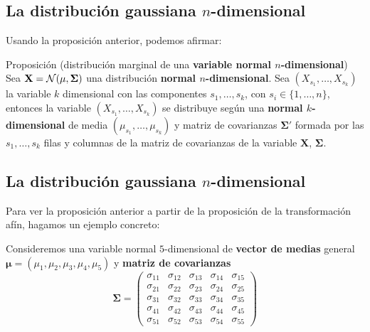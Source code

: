 \documentclass[]{book}
\begin{document}
\hypertarget{la-distribuciuxf3n-gaussiana-n-dimensional-4}{%
\subsection{\texorpdfstring{La distribución gaussiana \(n\)-dimensional}{La distribución gaussiana n-dimensional}}\label{la-distribuciuxf3n-gaussiana-n-dimensional-4}}

Usando la proposición anterior, podemos afirmar:

Proposición (distribución marginal de una \textbf{variable normal \(n\)-dimensional})
Sea \(\mathbf{X}={\cal N}(\mathbf{\mu},\mathbf{\Sigma})\) una distribución \textbf{normal \(n\)-dimensional}. Sea \((X_{s_1},\ldots,X_{s_k})\) la variable \(k\) dimensional con las componentes \(s_1,\ldots,s_k\), con \(s_i\in\{1,\ldots,n\}\), entonces la variable \((X_{s_1},\ldots,X_{s_k})\) se distribuye según una \textbf{normal \(k\)-dimensional} de media \((\mu_{s_1},\ldots,\mu_{s_k})\) y matriz de covarianzas \(\mathbf{\Sigma'}\) formada por las \(s_1,\ldots,s_k\) filas y columnas de la matriz de covarianzas de la variable \(\mathbf{X}\), \(\mathbf{\Sigma}\).

\hypertarget{la-distribuciuxf3n-gaussiana-n-dimensional-5}{%
\subsection{\texorpdfstring{La distribución gaussiana \(n\)-dimensional}{La distribución gaussiana n-dimensional}}\label{la-distribuciuxf3n-gaussiana-n-dimensional-5}}

Para ver la proposición anterior a partir de la proposición de la transformación afín, hagamos un ejemplo concreto:

Consideremos una variable normal \(5\)-dimensional de \textbf{vector de medias} general \(\mathbf{\mu}=(\mu_1,\mu_2,\mu_3,\mu_4,\mu_5)\) y \textbf{matriz de covarianzas}
\[
\mathbf{\Sigma}=\begin{pmatrix}
\sigma_{11} & \sigma_{12} & \sigma_{13} & \sigma_{14} & \sigma_{15} \\
\sigma_{21} & \sigma_{22} & \sigma_{23} & \sigma_{24} & \sigma_{25} \\
\sigma_{31} & \sigma_{32} & \sigma_{33} & \sigma_{34} & \sigma_{35} \\
\sigma_{41} & \sigma_{42} & \sigma_{43} & \sigma_{44} & \sigma_{45} \\
\sigma_{51} & \sigma_{52} & \sigma_{53} & \sigma_{54} & \sigma_{55} 
\end{pmatrix}
\]
\end{document}
